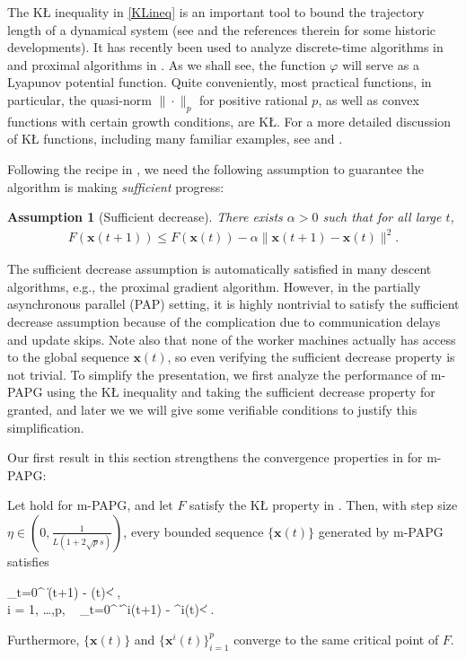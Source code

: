 \documentclass[leqno,onefignum,onetabnum]{siamart0516}
\newtheorem{assum}{Assumption}
\newcommand{\pap}{PAP\xspace}
\newcommand{\xb}{\mathbf{x}}
\newcommand{\KL}{K\L\xspace}
\newcommand{\mspg}{\textsf{m-PAPG}\xspace}
\begin{document}
The \KL inequality in \cref{KLineq} is an important tool to bound the trajectory length of a dynamical system (see \cite{BolteDLM10,initial_KL} and the references therein for some historic developments). It has recently been used to analyze discrete-time algorithms in \cite{AbsilMA05} and proximal algorithms in \cite{KL_gene_rate,KL_bound_sequence,prox_alter_linear}.
As we shall see, the function $\varphi$ will serve as a Lyapunov potential function.
Quite conveniently, most practical functions, in particular, the quasi-norm $\|\cdot\|_p$ for positive rational $p$, as well as convex functions with certain growth conditions, are \KL. 
For a more detailed discussion of \KL functions, including many familiar examples, see \cite[Section 5]{prox_alter_linear} and \cite[Section 4]{KL_bound_sequence}.

Following the recipe in \cite{prox_alter_linear}, we need the following assumption to guarantee the algorithm is making \emph{sufficient} progress:
\begin{assum}[Sufficient decrease]\label{assum:sd}
	There exists $\alpha \!>\! 0$ such that for all large $t$,
	\begin{align}
	F(\xb(t+1)) \leq F(\xb(t)) - \alpha \|\xb(t+1) - \xb(t)\|^2.
	\end{align}
\end{assum}
The sufficient decrease assumption is automatically satisfied in many descent algorithms, e.g., the proximal gradient algorithm. However, in the partially asynchronous parallel (\pap) setting, it is highly nontrivial to satisfy the sufficient decrease assumption because of the complication due to communication delays and update skips. 
Note also that none of the worker machines actually has access to the global sequence $\xb(t)$, so even verifying the sufficient decrease property is not trivial.
To simplify the presentation, we first analyze the performance of \mspg using the \KL inequality and taking the sufficient decrease property for granted, and later we we will give some verifiable conditions to justify this simplification.  

Our first result in this section strengthens the convergence properties in  for \mspg:
\begin{theorem}\label{thm:finite}
	Let  hold for \mspg,  and let $F$ satisfy the \KL property in . Then, with step size $\eta \in \left(0, \frac{1}{L(1+2\sqrt{p}s)}\right)$, every bounded sequence $\{\xb(t)\}$ generated by \mspg satisfies
	\begin{flalign}
	\label{global_finite}
	\sum_{t=0}^{\infty} \|\xb(t+1) - \xb(t)\| < \infty,\\
	\label{local_finite} 
	\forall i = 1, \ldots ,p, ~ 
	\sum_{t=0}^{\infty} \|\xb^i(t+1) - \xb^i(t)\| < \infty.
	\end{flalign}
	Furthermore, $\{\xb(t)\}$ and $\{\xb^i(t)\}_{i=1}^p$ converge to the same critical point of $F$.
\end{theorem}
\end{document}

